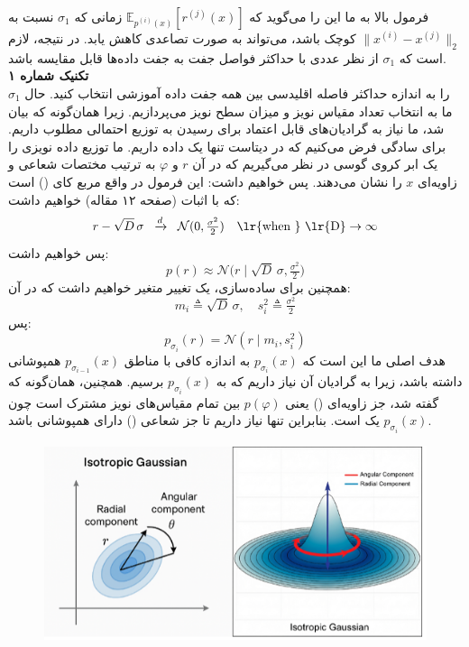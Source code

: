 \documentclass[12pt]{article}
\begin{document}
\begin{enumerate}
\begin{enumerate}
{        فرمول بالا به ما این را می‌گوید که 
        $\mathbb{E}_{p^{(i)}(x)} [r^{(j)}(x)]$ 
        زمانی که $\sigma_1$ نسبت به $\lVert x^{(i)} - x^{(j)} \rVert_2$ کوچک باشد، می‌تواند به صورت تصاعدی کاهش یابد.  
        در نتیجه، لازم است که $\sigma_1$ از نظر عددی با حداکثر فواصل جفت به جفت داده‌ها قابل مقایسه باشد.\\
        \textbf{تکنیک شماره ۱}\\
        $\sigma_1$ را به اندازه حداکثر فاصله اقلیدسی بین همه جفت داده آموزشی انتخاب کنید.  
        حال ما به انتخاب تعداد مقیاس نویز و میزان سطح نویز می‌پردازیم. زیرا همان‌گونه که بیان شد، ما نیاز به گرادیان‌های قابل اعتماد برای رسیدن به توزیع احتمالی مطلوب داریم. برای سادگی فرض می‌کنیم که در دیتاست تنها یک داده داریم.  
        ما توزیع داده نویزی را یک ابر کروی گوسی در نظر می‌گیریم که در آن $r$ و $\varphi$ به ترتیب مختصات شعاعی و زاویه‌ای $x$ را نشان می‌دهند. پس خواهیم داشت:
        این فرمول در واقع  مربع کای () است که با اثبات (صفحه ۱۲ مقاله) خواهیم داشت:
        $$
        r - \sqrt{D}\,\sigma \;\;\xrightarrow{d}\;\; \mathcal{N}(0, \tfrac{\sigma^2}{2}) \quad \text{\lr{when } } \text{\lr{D}} \to \infty
        $$
        پس خواهیم داشت:
        $$
        p(r) \approx \mathcal{N}\big(r \mid \sqrt{D}\,\sigma, \tfrac{\sigma^2}{2}\big)
        $$
        همچنین برای ساده‌سازی، یک تغییر متغیر خواهیم داشت که در آن:
        $$
        m_i \triangleq \sqrt{D}\,\sigma, \quad s_i^2 \triangleq \tfrac{\sigma^2}{2}
        $$
        پس:
        $$
        p_{\sigma_i}(r) = \mathcal{N}(r \mid m_i, s_i^2)
        $$
        هدف اصلی ما این است که $p_{\sigma_i}(x)$ به اندازه کافی با مناطق $p_{\sigma_{i-1}}(x)$ همپوشانی داشته باشد، زیرا به گرادیان آن نیاز داریم که به $p_{\sigma_i}(x)$ برسیم.  
        همچنین، همان‌گونه که گفته شد، جز زاویه‌ای () یعنی $p(\varphi)$ بین تمام مقیاس‌های نویز مشترک است چون $p_{\sigma_i}(x)$ یک  است. بنابراین تنها نیاز داریم تا جز شعاعی () دارای همپوشانی باشد.
        \begin{figure}[h]
            \centering
            \includegraphics[width=\textwidth]{figs/Q1_1.png}

\end{figure}}
\end{enumerate}
\end{enumerate}
\end{document}
